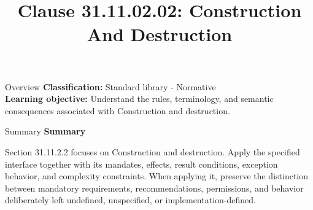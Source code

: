 \documentclass[10pt,letterpaper]{article}
\title{Clause 31.11.02.02: Construction And Destruction}
\author{}
\date{}
\begin{document}
\maketitle
\begin{CornellOverviewBox}{Overview}
\textbf{Classification:} Standard library - Normative\\[2pt]
\textbf{Learning objective:} Understand the rules, terminology, and semantic consequences associated with Construction and destruction.
\end{CornellOverviewBox}\begin{CornellSummaryBox}{Summary}
{\sffamily\bfseries\color{Accent} Summary}\par\vspace{3pt}Section 31.11.2.2 focuses on Construction and destruction. Apply the specified interface together with its mandates, effects, result conditions, exception behavior, and complexity constraints. When applying it, preserve the distinction between mandatory requirements, recommendations, permissions, and behavior deliberately left undefined, unspecified, or implementation-defined.
\end{CornellSummaryBox}
\end{document}
